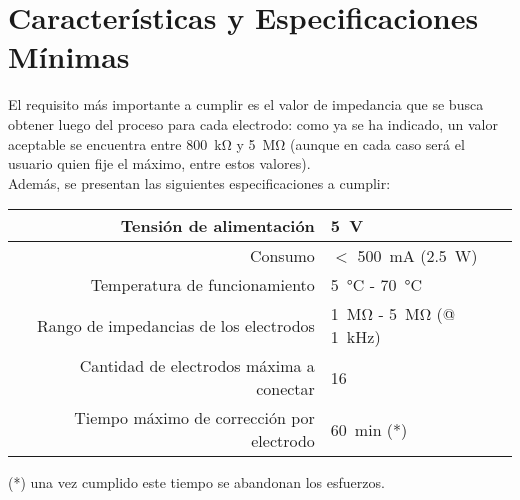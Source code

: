 \section{Características y Especificaciones Mínimas}

El requisito más importante a cumplir es el valor de impedancia que se busca obtener luego del proceso para cada electrodo: como ya se ha indicado, un valor aceptable se encuentra entre \SI{800}{\kilo\ohm} y \SI{5}{\mega\ohm} (aunque en cada caso será el usuario quien fije el máximo, entre estos valores).\\
Además, se presentan las siguientes especificaciones a cumplir:

\begin{tabular}{|r|l|}
    \hline
    Tensión de alimentación &
    \SI{5}{\volt} \\ \hline
    Consumo &
    $<$ \SI{500}{\milli\ampere} (\SI{2.5}{\watt}) \\ \hline
    Temperatura de funcionamiento &
    \SI{5}{\celsius} - \SI{70}{\celsius} \\ \hline
    Rango de impedancias de los electrodos &
    \SI{1}{\mega\ohm} - \SI{5}{\mega\ohm} (@ \SI{1}{\kilo\hertz})\\ \hline
    Cantidad de electrodos máxima a conectar &
    16 \\ \hline
    Tiempo máximo de corrección por electrodo &
    \SI{60}{\minute} (*)\\ \hline
\end{tabular}

(*) una vez cumplido este tiempo se abandonan los esfuerzos.


